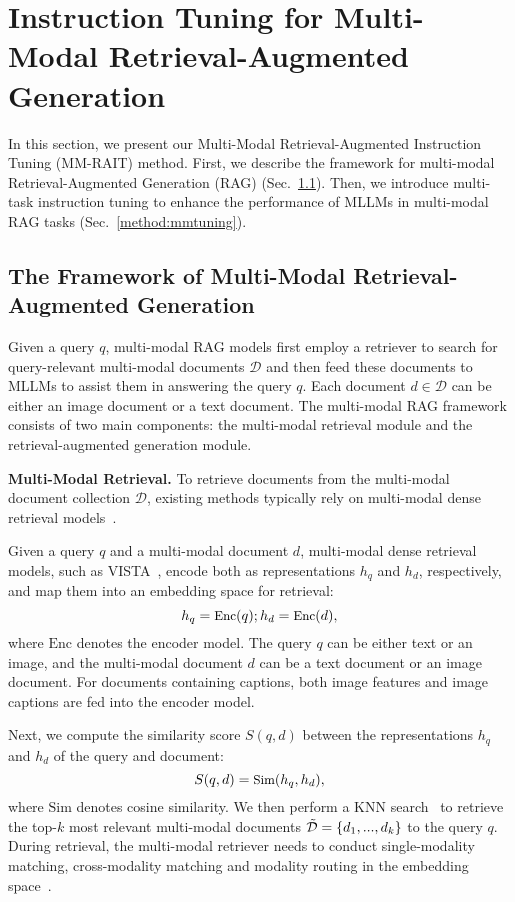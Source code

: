 \section{Instruction Tuning for Multi-Modal Retrieval-Augmented Generation}
In this section, we present our Multi-Modal Retrieval-Augmented Instruction Tuning (MM-RAIT) method. First, we describe the framework for multi-modal Retrieval-Augmented Generation (RAG) (Sec.~\ref{method:rag}). Then, we introduce multi-task instruction tuning to enhance the performance of MLLMs in multi-modal RAG tasks (Sec.~\ref{method:mmtuning}).

\subsection{The Framework of Multi-Modal Retrieval-Augmented Generation}
\label{method:rag}

Given a query $q$, multi-modal RAG models first employ a retriever to search for query-relevant multi-modal documents $\mathcal{D}$ and then feed these documents to MLLMs to assist them in answering the query $q$. Each document $d \in \mathcal{D}$ can be either an image document or a text document. The multi-modal RAG framework consists of two main components: the multi-modal retrieval module and the retrieval-augmented generation module.

\textbf{Multi-Modal Retrieval.}
To retrieve documents from the multi-modal document collection $\mathcal{D}$, existing methods typically rely on multi-modal dense retrieval models~\cite{zhou2024marvel,zhou2024vista}.

Given a query $q$ and a multi-modal document $d$, multi-modal dense retrieval models, such as VISTA~\cite{zhou2024vista}, encode both as representations $h_q$ and $h_d$, respectively, and map them into an embedding space for retrieval: 
\begin{equation}
\small
h_q = \text{Enc} (q); h_d = \text{Enc}(d), 
\end{equation} 
where $\text{Enc}$ denotes the encoder model. The query $q$ can be either text or an image, and the multi-modal document $d$ can be a text document or an image document. For documents containing captions, both image features and image captions are fed into the encoder model.

Next, we compute the similarity score $S(q,d)$ between the representations $h_q$ and $h_d$ of the query and document:
\begin{equation} 
\small
S(q,d) = \text{Sim}(h_q,h_d), 
\end{equation} 
where $\text{Sim}$ denotes cosine similarity. We then perform a KNN search~\cite{johnson2019billion} to retrieve the top-$k$ most relevant multi-modal documents $\Tilde{\mathcal{D}}=\{d_1,...,d_k\}$ to the query $q$. During retrieval, the multi-modal retriever needs to conduct single-modality matching, cross-modality matching and modality routing in the embedding space~\cite{liu2022universal}.

